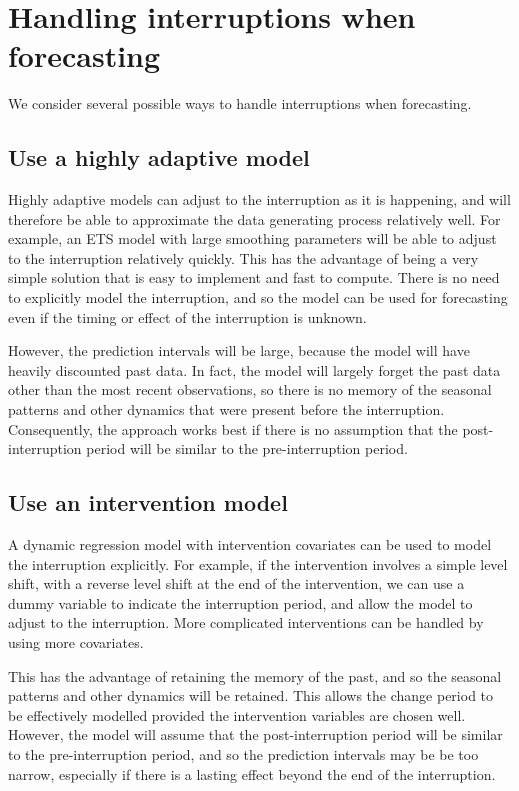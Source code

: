 \documentclass[11pt,a4paper,]{article}
\begin{document}
\section{Handling interruptions when forecasting}\label{sec-methods}

We consider several possible ways to handle interruptions when
forecasting.

\subsection{Use a highly adaptive
model}\label{use-a-highly-adaptive-model}

Highly adaptive models can adjust to the interruption as it is
happening, and will therefore be able to approximate the data generating
process relatively well. For example, an ETS model with large smoothing
parameters will be able to adjust to the interruption relatively
quickly. This has the advantage of being a very simple solution that is
easy to implement and fast to compute. There is no need to explicitly
model the interruption, and so the model can be used for forecasting
even if the timing or effect of the interruption is unknown.

However, the prediction intervals will be large, because the model will
have heavily discounted past data. In fact, the model will largely
forget the past data other than the most recent observations, so there
is no memory of the seasonal patterns and other dynamics that were
present before the interruption. Consequently, the approach works best
if there is no assumption that the post-interruption period will be
similar to the pre-interruption period.

\subsection{Use an intervention model}\label{use-an-intervention-model}

A dynamic regression model with intervention covariates can be used to
model the interruption explicitly. For example, if the intervention
involves a simple level shift, with a reverse level shift at the end of
the intervention, we can use a dummy variable to indicate the
interruption period, and allow the model to adjust to the interruption.
More complicated interventions can be handled by using more covariates.

This has the advantage of retaining the memory of the past, and so the
seasonal patterns and other dynamics will be retained. This allows the
change period to be effectively modelled provided the intervention
variables are chosen well. However, the model will assume that the
post-interruption period will be similar to the pre-interruption period,
and so the prediction intervals may be be too narrow, especially if
there is a lasting effect beyond the end of the interruption.
\end{document}
